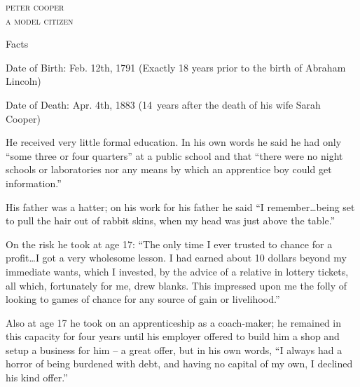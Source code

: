 \documentclass{article}
\begin{document}
\centering
{}
\fontsize{0.8in}{0.6in}\selectfont
\scshape 
{} peter cooper \\
 a model citizen

\vspace{0.05in}

\fontsize{16pt}{16pt}\selectfont
{}
\justify
Facts

\vspace{0.1in}

\begin{minipage}[t]{0.46\linewidth}
\fontsize{10.7pt}{12.7pt}\selectfont
\raggedright
\upshape
\begin{enumList}

\item Date of Birth: Feb. 12th, 1791 (Exactly 18 years prior to the birth of
{\mdseries Abraham Lincoln})

\item Date of Death: Apr. 4th, 1883 (14~years after the death of his wife
{\mdseries Sarah Cooper})

\item He received {\mdseries very little formal education}. In his own words
he said he had only ``some three or four quarters'' at a public school and
that ``there were no night schools or laboratories nor any means by which an
apprentice boy could get information.''

\item His father was a hatter; on his work for his father he said ``I
remember\ldots being set to pull the hair out of rabbit skins, when {\mdseries
my head was just above the table}.''

\item On the risk he took at age 17: ``The only time I ever trusted to chance
for a profit\ldots I got a very wholesome lesson. I had earned about 10
dollars beyond my immediate wants, which I invested, by the advice of a
relative in lottery tickets, all which, fortunately for me, drew blanks. This
impressed upon me the {\mdseries folly of looking to games of chance} for any
source of gain or livelihood.''

\item Also at age 17 he took on an apprenticeship as a coach-maker; he remained in
this capacity for four years until his employer offered to build him a shop
and setup a business for him -- a great offer, but in his own words, ``I
always had a {\mdseries horror of being burdened with debt}, and having no
capital of my own, {\mdseries I declined his kind offer}.''


\end{enumList}
\end{minipage}
\end{document}
